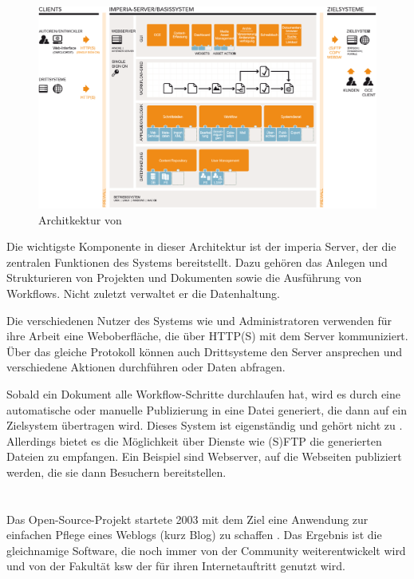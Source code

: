             \begin{figure}
                \centering
                \includegraphics[width=\textwidth]{../resources/imperia/architektur.png}
                \caption{Architkektur von {\imperia} \cite{imperia:ecmd}}
                \label{image:imperiaArchitektur}
            \end{figure}

            Die wichtigste Komponente in dieser Architektur ist der imperia Server,
            der die zentralen Funktionen des Systems bereitstellt.
            Dazu gehören das Anlegen und Strukturieren von Projekten
            und Dokumenten sowie die Ausführung von Workflows.
            Nicht zuletzt verwaltet er die Datenhaltung.

            Die verschiedenen Nutzer des Systems wie {\editors} und Administratoren
            verwenden für ihre Arbeit eine Weboberfläche,
            die über HTTP(S) mit dem Server kommuniziert.
            Über das gleiche Protokoll können auch Drittsysteme den Server
            ansprechen und verschiedene Aktionen durchführen oder Daten abfragen.

            Sobald ein Dokument alle Workflow-Schritte durchlaufen hat,
            wird es durch eine automatische oder manuelle Publizierung
            in eine Datei generiert, die dann auf ein Zielsystem übertragen wird.
            Dieses System ist eigenständig und gehört nicht zu {\imperia}.
            Allerdings bietet es die Möglichkeit über Dienste wie (S)FTP
            die generierten Dateien zu empfangen.
            Ein Beispiel sind Webserver, auf die Webseiten publiziert werden,
            die sie dann Besuchern bereitstellen.

    \section{\wordpress}
        Das Open-Source-Projekt {\wordpress} startete 2003
        mit dem Ziel eine Anwendung zur einfachen Pflege eines Weblogs
        (kurz Blog) zu schaffen \cite{wordpress:About}.
        Das Ergebnis ist die gleichnamige Software,
        die noch immer von der Community weiterentwickelt wird
        und von der Fakultät \gls{ksw} der {\fernUni} für ihren
        Internetauftritt genutzt wird.
        
